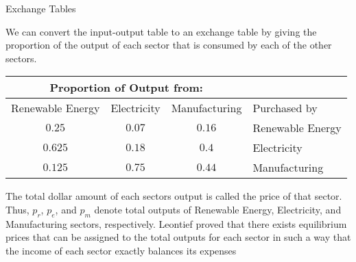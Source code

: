 \documentclass[xcolor=dvipsnames, aspectratio=169]{beamer}
\begin{document}
\begin{frame}{Exchange Tables}

  We can convert the input-output table to an \alert{exchange table} by giving the proportion of the output of each sector that is consumed by each of the other sectors.

  \pause
  \begin{center}
\begin{tabular}{|c|c|c|l|}
    \hline
    \multicolumn{3}{|c|}{Proportion of Output from:} &  \\
    \hline
   Renewable Energy & Electricity & Manufacturing & Purchased by \\
    \hline
    $0.25$ & $0.07$ & $0.16$ & Renewable Energy\\
    \hline
    $0.625$ & $0.18$ & $0.4$ & Electricity\\
    \hline
    $0.125$ & $0.75$ & $0.44$ & Manufacturing\\ 
    \hline
\end{tabular}
\end{center}

  \pause
{\small
 \bi
  \ii The total dollar amount of each sectors output is called the \alert{price} of that sector.
  \pause
  \ii Thus, \alert{$p_r$}, \alert{$p_e$}, and \alert{$p_m$} denote total outputs of Renewable Energy, Electricity, and Manufacturing sectors, respectively.
  \pause
  \ii Leontief proved that there exists equilibrium prices that can be assigned to the total outputs for each sector in such a way that the income of each sector exactly balances its expenses
  \pause
  \ii {}
  \ei
}

\end{frame}
  
\end{document}
